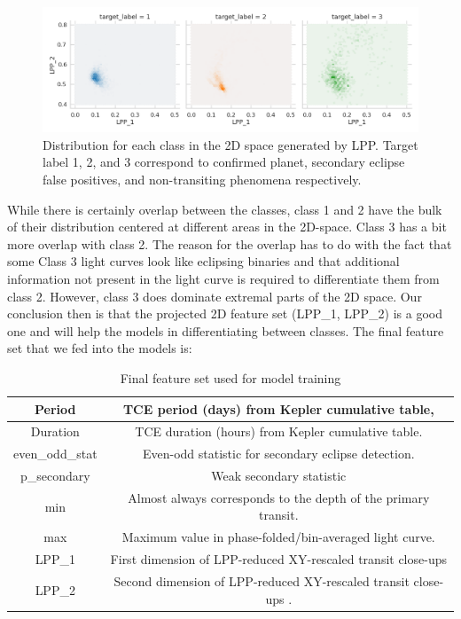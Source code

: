 \documentclass{article}
\begin{document}
  \begin{figure}[H]
	\begin{center}
		\includegraphics[totalheight=4cm]{figures/lpp_hexbinplot.png}
	\end{center}
	\caption{Distribution for each class in the 2D space generated by LPP. Target label 1, 2, and 3 correspond to confirmed planet, secondary eclipse false positives, and non-transiting phenomena respectively.}
\end{figure}
While there is certainly overlap between the classes, class 1 and 2 have the bulk of their distribution centered at different areas in the 2D-space. Class 3 has a bit more overlap with class 2. The reason for the overlap has to do with the fact that some Class 3 light curves look like eclipsing binaries and that additional information not present in the light curve is required to differentiate them from class 2. However, class 3 does dominate extremal parts of the 2D space. Our conclusion then is that the projected 2D feature set  (LPP\_1, LPP\_2) is a good one and will help the models in differentiating between classes. The final feature set that we fed into the models is: 
\begin{table}[H]
	\begin{tabular}{|c|c|}
		\hline
		Period &  TCE period (days) from Kepler cumulative table,\\
		\hline
		Duration & TCE duration (hours) from Kepler cumulative table. \\
		\hline
		even\_odd\_stat & Even-odd statistic for secondary eclipse detection. \\
		\hline
		p\_secondary & Weak secondary statistic  \\
		\hline
		min & Almost always corresponds to the depth of the primary transit.  \\
		\hline
		max & Maximum value in phase-folded/bin-averaged light curve. \\
		\hline
		LPP\_1 & First dimension of LPP-reduced XY-rescaled transit close-ups  \\
		\hline
		LPP\_2 & Second dimension of LPP-reduced XY-rescaled transit close-ups . \\
		\hline
	\end{tabular}
	\caption{Final feature set used for model training}
\end{table}
\end{document}
